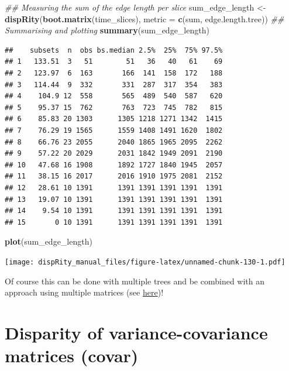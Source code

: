 \documentclass[
]{book}
\newenvironment{Shaded}{\begin{snugshade}}{\end{snugshade}}
\newcommand{\CommentTok}[1]{\textcolor[rgb]{0.56,0.35,0.01}{\textit{#1}}}
\newcommand{\DataTypeTok}[1]{\textcolor[rgb]{0.13,0.29,0.53}{#1}}
\newcommand{\KeywordTok}[1]{\textcolor[rgb]{0.13,0.29,0.53}{\textbf{#1}}}
\newcommand{\NormalTok}[1]{#1}
\newcommand{\StringTok}[1]{\textcolor[rgb]{0.31,0.60,0.02}{#1}}
\begin{document}
\begin{Shaded}
\begin{Highlighting}[]
\CommentTok{\#\# Measuring the sum of the edge length per slice}
\NormalTok{sum\_edge\_length \textless{}{-}}\StringTok{ }\KeywordTok{dispRity}\NormalTok{(}\KeywordTok{boot.matrix}\NormalTok{(time\_slices), }\DataTypeTok{metric =} \KeywordTok{c}\NormalTok{(sum, edge.length.tree))}
\CommentTok{\#\# Summarising and plotting}
\KeywordTok{summary}\NormalTok{(sum\_edge\_length)}
\end{Highlighting}
\end{Shaded}

\begin{verbatim}
##    subsets  n  obs bs.median 2.5%  25%  75% 97.5%
## 1   133.51  3   51        51   36   40   61    69
## 2   123.97  6  163       166  141  158  172   188
## 3   114.44  9  332       331  287  317  354   383
## 4    104.9 12  558       565  489  540  587   620
## 5    95.37 15  762       763  723  745  782   815
## 6    85.83 20 1303      1305 1218 1271 1342  1415
## 7    76.29 19 1565      1559 1408 1491 1620  1802
## 8    66.76 23 2055      2040 1865 1965 2095  2262
## 9    57.22 20 2029      2031 1842 1949 2091  2190
## 10   47.68 16 1908      1892 1727 1840 1945  2057
## 11   38.15 16 2017      2016 1910 1975 2081  2152
## 12   28.61 10 1391      1391 1391 1391 1391  1391
## 13   19.07 10 1391      1391 1391 1391 1391  1391
## 14    9.54 10 1391      1391 1391 1391 1391  1391
## 15       0 10 1391      1391 1391 1391 1391  1391
\end{verbatim}

\begin{Shaded}
\begin{Highlighting}[]
\KeywordTok{plot}\NormalTok{(sum\_edge\_length)}
\end{Highlighting}
\end{Shaded}

\texttt{[image: dispRity\_manual\_files/figure-latex/unnamed-chunk-130-1.pdf]}

Of course this can be done with multiple trees and be combined with an approach using multiple matrices (see \protect\hyperlink{multi.input}{here})!

\hypertarget{covar}{%
\section{Disparity of variance-covariance matrices (covar)}\label{covar}}
\end{document}
